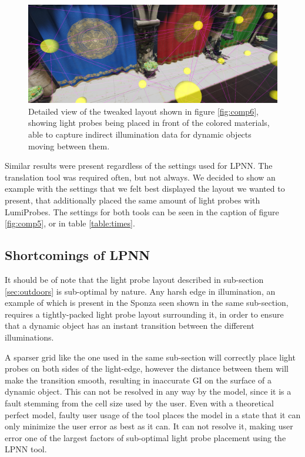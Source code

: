 \begin{figure}[H]
	\centering
	\includegraphics[width=\linewidth]{Graphics/results/sponza_0.4_2_C.jpg}
	\caption{Detailed view of the tweaked layout shown in figure \ref{fig:comp6}, showing light probes being placed in front of the colored materials, able to capture indirect illumination data for dynamic objects moving between them.}
	\label{fig:sponza_detail}
\end{figure}

Similar results were present regardless of the settings used for LPNN. The translation tool was required often, but not always. We decided to show an example with the settings that we felt best displayed the layout we wanted to present, that additionally placed the same amount of light probes with LumiProbes. The settings for both tools can be seen in the caption of figure \ref{fig:comp5}, or in table \ref{table:times}.

\subsection{Shortcomings of LPNN}

It should be of note that the light probe layout described in sub-section \ref{sec:outdoors} is sub-optimal by nature. Any harsh edge in illumination, an example of which is present in the Sponza seen shown in the same sub-section, requires a tightly-packed light probe layout surrounding it, in order to ensure that a dynamic object has an instant transition between the different illuminations.

A sparser grid like the one used in the same sub-section will correctly place light probes on both sides of the light-edge, however the distance between them will make the transition smooth, resulting in inaccurate GI on the surface of a dynamic object. This can not be resolved in any way by the model, since it is a fault stemming from the cell size used by the user. Even with a theoretical perfect model, faulty user usage of the tool places the model in a state that it can only minimize the user error as best as it can. It can not resolve it, making user error one of the largest factors of sub-optimal light probe placement using the LPNN tool.\newline

